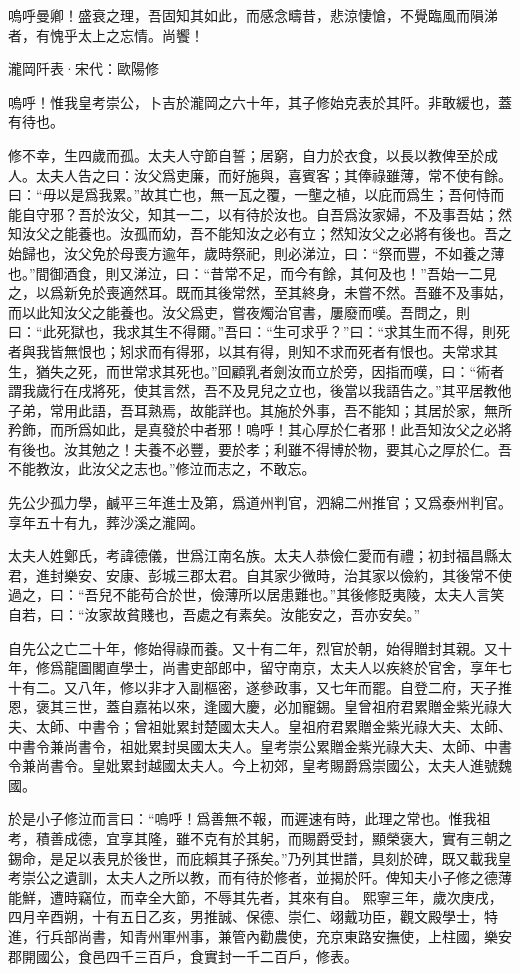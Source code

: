 \documentclass[12pt,a4paper]{ctexbook}
\begin{document}
嗚呼曼卿！盛衰之理，吾固知其如此，而感念疇昔，悲涼悽愴，不覺臨風而隕涕者，有愧乎太上之忘情。尚饗！\par
瀧岡阡表·宋代：歐陽修 \par
嗚呼！惟我皇考崇公，卜吉於瀧岡之六十年，其子修始克表於其阡。非敢緩也，蓋有待也。\par
修不幸，生四歲而孤。太夫人守節自誓；居窮，自力於衣食，以長以教俾至於成人。太夫人告之曰：汝父爲吏廉，而好施與，喜賓客；其俸祿雖薄，常不使有餘。曰：“毋以是爲我累。”故其亡也，無一瓦之覆，一壟之植，以庇而爲生；吾何恃而能自守邪？吾於汝父，知其一二，以有待於汝也。自吾爲汝家婦，不及事吾姑；然知汝父之能養也。汝孤而幼，吾不能知汝之必有立；然知汝父之必將有後也。吾之始歸也，汝父免於母喪方逾年，歲時祭祀，則必涕泣，曰：“祭而豐，不如養之薄也。”間御酒食，則又涕泣，曰：“昔常不足，而今有餘，其何及也！”吾始一二見之，以爲新免於喪適然耳。既而其後常然，至其終身，未嘗不然。吾雖不及事姑，而以此知汝父之能養也。汝父爲吏，嘗夜燭治官書，屢廢而嘆。吾問之，則曰：“此死獄也，我求其生不得爾。”吾曰：“生可求乎？”曰：“求其生而不得，則死者與我皆無恨也；矧求而有得邪，以其有得，則知不求而死者有恨也。夫常求其生，猶失之死，而世常求其死也。”回顧乳者劍汝而立於旁，因指而嘆，曰：“術者謂我歲行在戌將死，使其言然，吾不及見兒之立也，後當以我語告之。”其平居教他子弟，常用此語，吾耳熟焉，故能詳也。其施於外事，吾不能知；其居於家，無所矜飾，而所爲如此，是真發於中者邪！嗚呼！其心厚於仁者邪！此吾知汝父之必將有後也。汝其勉之！夫養不必豐，要於孝；利雖不得博於物，要其心之厚於仁。吾不能教汝，此汝父之志也。”修泣而志之，不敢忘。\par
先公少孤力學，鹹平三年進士及第，爲道州判官，泗綿二州推官；又爲泰州判官。享年五十有九，葬沙溪之瀧岡。\par
太夫人姓鄭氏，考諱德儀，世爲江南名族。太夫人恭儉仁愛而有禮；初封福昌縣太君，進封樂安、安康、彭城三郡太君。自其家少微時，治其家以儉約，其後常不使過之，曰：“吾兒不能苟合於世，儉薄所以居患難也。”其後修貶夷陵，太夫人言笑自若，曰：“汝家故貧賤也，吾處之有素矣。汝能安之，吾亦安矣。”\par
自先公之亡二十年，修始得祿而養。又十有二年，烈官於朝，始得贈封其親。又十年，修爲龍圖閣直學士，尚書吏部郎中，留守南京，太夫人以疾終於官舍，享年七十有二。又八年，修以非才入副樞密，遂參政事，又七年而罷。自登二府，天子推恩，褒其三世，蓋自嘉祐以來，逢國大慶，必加寵錫。皇曾祖府君累贈金紫光祿大夫、太師、中書令；曾祖妣累封楚國太夫人。皇祖府君累贈金紫光祿大夫、太師、中書令兼尚書令，祖妣累封吳國太夫人。皇考崇公累贈金紫光祿大夫、太師、中書令兼尚書令。皇妣累封越國太夫人。今上初郊，皇考賜爵爲崇國公，太夫人進號魏國。\par
於是小子修泣而言曰：“嗚呼！爲善無不報，而遲速有時，此理之常也。惟我祖考，積善成德，宜享其隆，雖不克有於其躬，而賜爵受封，顯榮褒大，實有三朝之錫命，是足以表見於後世，而庇賴其子孫矣。”乃列其世譜，具刻於碑，既又載我皇考崇公之遺訓，太夫人之所以教，而有待於修者，並揭於阡。俾知夫小子修之德薄能鮮，遭時竊位，而幸全大節，不辱其先者，其來有自。 熙寧三年，歲次庚戌，四月辛酉朔，十有五日乙亥，男推誠、保德、崇仁、翊戴功臣，觀文殿學士，特進，行兵部尚書，知青州軍州事，兼管內勸農使，充京東路安撫使，上柱國，樂安郡開國公，食邑四千三百戶，食實封一千二百戶，修表。\par
\end{document}
